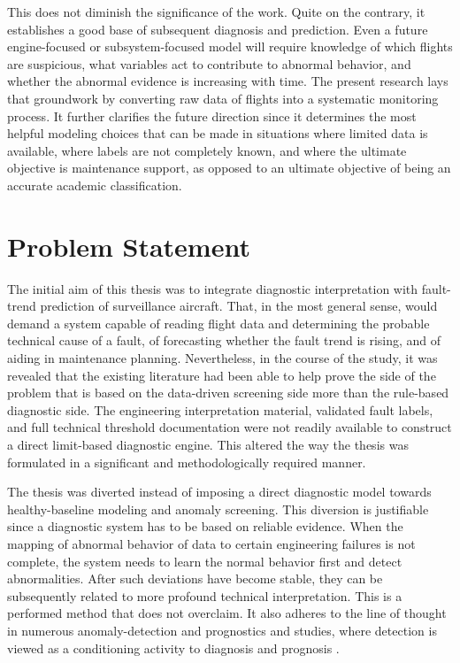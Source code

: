 \documentclass[12pt,a4paper]{report}
\begin{document}
	This does not diminish the significance of the work. Quite on the contrary, it establishes a good base of subsequent diagnosis and prediction. Even a future engine-focused or subsystem-focused model will require knowledge of which flights are suspicious, what variables act to contribute to abnormal behavior, and whether the abnormal evidence is increasing with time. The present research lays that groundwork by converting raw data of flights into a systematic monitoring process. It further clarifies the future direction since it determines the most helpful modeling choices that can be made in situations where limited data is available, where labels are not completely known, and where the ultimate objective is maintenance support, as opposed to an ultimate objective of being an accurate academic classification.
	
	\section{Problem Statement}
	
	The initial aim of this thesis was to integrate diagnostic interpretation with fault-trend prediction of surveillance aircraft. That, in the most general sense, would demand a system capable of reading flight data and determining the probable technical cause of a fault, of forecasting whether the fault trend is rising, and of aiding in maintenance planning. Nevertheless, in the course of the study, it was revealed that the existing literature had been able to help prove the side of the problem that is based on the data-driven screening side more than the rule-based diagnostic side. The engineering interpretation material, validated fault labels, and full technical threshold documentation were not readily available to construct a direct limit-based diagnostic engine. This altered the way the thesis was formulated in a significant and methodologically required manner.
	
	The thesis was diverted instead of imposing a direct diagnostic model towards healthy-baseline modeling and anomaly screening. This diversion is justifiable since a diagnostic system has to be based on reliable evidence. When the mapping of abnormal behavior of data to certain engineering failures is not complete, the system needs to learn the normal behavior first and detect abnormalities. After such deviations have become stable, they can be subsequently related to more profound technical interpretation. This is a performed method that does not overclaim. It also adheres to the line of thought in numerous anomaly-detection and prognostics and studies, where detection is viewed as a conditioning activity to diagnosis and prognosis \cite{chandola2009survey,jardine2006cbm,si2011rul}.
	
\end{document}
